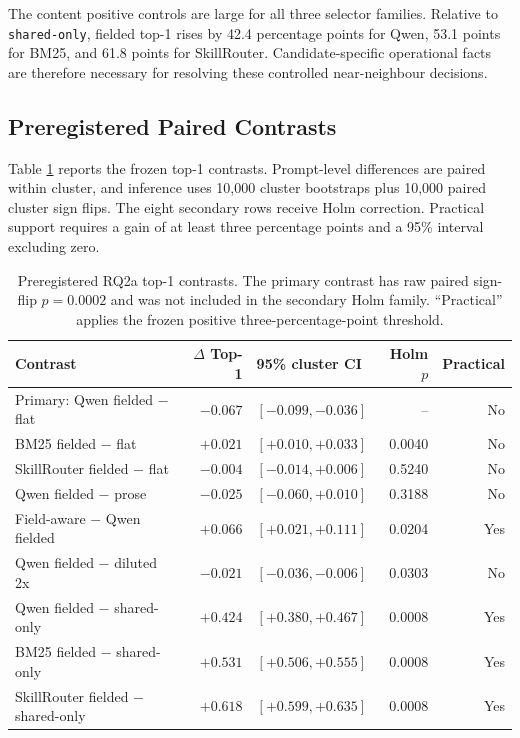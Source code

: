 The content positive controls are large for all three selector families. Relative to \texttt{shared-only}, fielded top-1 rises by 42.4 percentage points for Qwen, 53.1 points for BM25, and 61.8 points for SkillRouter. Candidate-specific operational facts are therefore necessary for resolving these controlled near-neighbour decisions.

\subsection{Preregistered Paired Contrasts}

Table \ref{tab:rq2a-preregistered-contrasts} reports the frozen top-1 contrasts. Prompt-level differences are paired within cluster, and inference uses 10,000 cluster bootstraps plus 10,000 paired cluster sign flips. The eight secondary rows receive Holm correction. Practical support requires a gain of at least three percentage points and a 95\% interval excluding zero.

\begin{table}[H]
\centering
\scriptsize
\setlength{\tabcolsep}{2pt}
\begin{tabular}{p{}rp{}rr}
\toprule
Contrast & $\Delta$ Top-1 & 95\% cluster CI & Holm $p$ & Practical \\
\midrule
Primary: Qwen fielded $-$ flat & $-0.067$ & $[-0.099,-0.036]$ & -- & No \\
BM25 fielded $-$ flat & $+0.021$ & $[+0.010,+0.033]$ & 0.0040 & No \\
SkillRouter fielded $-$ flat & $-0.004$ & $[-0.014,+0.006]$ & 0.5240 & No \\
Qwen fielded $-$ prose & $-0.025$ & $[-0.060,+0.010]$ & 0.3188 & No \\
Field-aware $-$ Qwen fielded & $+0.066$ & $[+0.021,+0.111]$ & 0.0204 & Yes \\
Qwen fielded $-$ diluted 2x & $-0.021$ & $[-0.036,-0.006]$ & 0.0303 & No \\
Qwen fielded $-$ shared-only & $+0.424$ & $[+0.380,+0.467]$ & 0.0008 & Yes \\
BM25 fielded $-$ shared-only & $+0.531$ & $[+0.506,+0.555]$ & 0.0008 & Yes \\
SkillRouter fielded $-$ shared-only & $+0.618$ & $[+0.599,+0.635]$ & 0.0008 & Yes \\
\bottomrule
\end{tabular}
\caption{Preregistered RQ2a top-1 contrasts. The primary contrast has raw paired sign-flip $p=0.0002$ and was not included in the secondary Holm family. ``Practical'' applies the frozen positive three-percentage-point threshold.}
\label{tab:rq2a-preregistered-contrasts}
\end{table}

